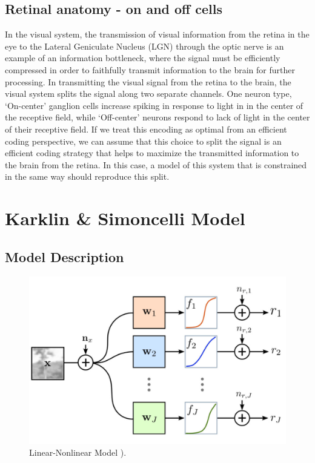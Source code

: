 \documentclass{article}
\begin{document}
\subsection{Retinal anatomy - on and off cells}
	In the visual system, the transmission of visual information from the retina in the eye to the Lateral Geniculate Nucleus (LGN) through the optic nerve is an example of an information bottleneck, where the signal must be efficiently compressed in order to faithfully transmit information to the brain for further processing. In transmitting the visual signal from the retina to the brain, the visual system splits the signal along two separate channels. One neuron type, ‘On-center’ ganglion cells increase spiking in response to light in in the center of the receptive field, while ‘Off-center’ neurons respond to lack of light in the center of their receptive field. If we treat this encoding as optimal from an efficient coding perspective, we can assume that this choice to split the signal is an efficient coding strategy that helps to maximize the transmitted information to the brain from the retina. In this case, a model of this system that is constrained in the same way should reproduce this split. \par


\section{Karklin \& Simoncelli Model}


\subsection{Model Description}

\begin{figure}
  \centering
    \includegraphics[width=1\linewidth]{ksfig1.png}
  \caption{Linear-Nonlinear Model {\cite{karksim11}}).}
  \label{fig:ksfig1}
\end{figure}
\end{document}
